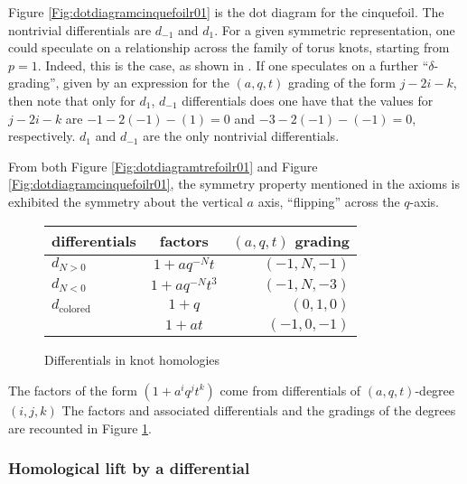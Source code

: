\documentclass[a4paper,titlepage,twoside]{book}
\begin{document}
Figure \ref{Fig:dotdiagramcinquefoilr01} is the dot diagram for the cinquefoil.  The nontrivial differentials are $d_{-1}$ and $d_1$.  For a given symmetric representation, one could speculate on a relationship across the family of torus knots, starting from $p=1$.  Indeed, this is the case, as shown in \cite{DunfieldGukovRasmussen2005}.      If one speculates on a further ``$\delta$-grading'', given by an expression for the $(a,q,t)$ grading of the form $j - 2i -k$, then note that only for $d_1$, $d_{-1}$ differentials does one have that the values for $j-2i-k$ are $-1 - 2(-1) -(1) =0$ and $-3 - 2(-1) - (-1) = 0$, respectively.   $d_1$ and $d_{-1}$ are the only nontrivial differentials.

From both Figure \ref{Fig:dotdiagramtrefoilr01} and Figure \ref{Fig:dotdiagramcinquefoilr01}, the symmetry property mentioned in the axioms is exhibited the symmetry about the vertical $a$ axis, ``flipping'' across the $q$-axis.

\begin{figure}[h]
  \begin{center}
    \begin{tabular}{l c r }
      differentials & factors & $(a,q,t)$ grading \\
      \hline
      $d_{N >0 }$           &  $ 1 +  aq^{-N}t  $  & $ ( -1 , N , -1 ) $ \\
      $d_{N<0} $            &  $ 1 + aq^{-N} t^3 $ & $ (-1 , N , -3 )  $ \\ 
      $d_{\text{colored} }$ &  $ 1 + q $           & $ ( 0, 1, 0 ) $     \\
                            &  $ 1 + at $          & $ ( -1, 0 , -1 )$   \\
      \end{tabular}
  \end{center} 
\caption{Differentials in knot homologies} \label{Fig:differentialschart}
\end{figure}

The factors of the form $(1 + a^i q^j t^k)$ come from differentials of $(a,q,t)$-degree $(i,j,k)$ The factors and associated differentials and the gradings of the degrees are recounted in Figure \ref{Fig:differentialschart}.

\subsubsection{Homological lift by a differential} \label{subsubsec:homoliftviadiff}
\end{document}
